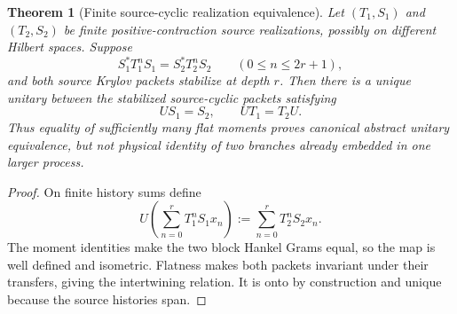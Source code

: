 \documentclass[11pt]{article}
\newtheorem{theorem}{Theorem}[section]
\theoremstyle{definition}
\theoremstyle{remark}
\begin{document}
\begin{theorem}[Finite source-cyclic realization equivalence]
\label{thm:source-cyclic-equivalence-master}
Let $(T_1,S_1)$ and $(T_2,S_2)$ be finite positive-contraction source
realizations, possibly on different Hilbert spaces.  Suppose
\begin{equation}
  S_1^*T_1^nS_1=S_2^*T_2^nS_2
  \qquad(0\le n\le2r+1),
  \label{eq:source-cyclic-moment-equality-master}
\end{equation}
and both source Krylov packets stabilize at depth $r$.  Then there is a unique
unitary between the stabilized source-cyclic packets satisfying
\begin{equation}
  \boxed{US_1=S_2,\qquad UT_1=T_2U.}
  \label{eq:source-cyclic-unitary-master}
\end{equation}
Thus equality of sufficiently many flat moments proves canonical abstract
unitary equivalence, but not physical identity of two branches already embedded
in one larger process.
\end{theorem}

\begin{proof}
On finite history sums define
\[
  U\left(\sum_{n=0}^{r}T_1^nS_1x_n\right)
  :=\sum_{n=0}^{r}T_2^nS_2x_n.
\]
The moment identities make the two block Hankel Grams equal, so the map is
well defined and isometric.  Flatness makes both packets invariant under their
transfers, giving the intertwining relation.  It is onto by construction and
unique because the source histories span.
\end{proof}
\end{document}
